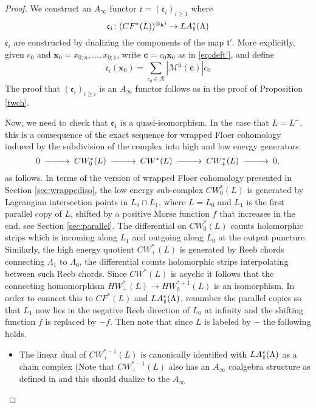 \documentclass{gtpart}
\renewcommand{\k}{\mathbf{k}}
\newcommand{\e}{\mathfrak{e}}
\renewcommand{\t}{\mathfrak{t}}
\newcommand{\fl}{\mathrm{fi}}
\renewcommand{\parallel}{{\mkern3mu\vphantom{\perp}\vrule depth 0pt\mkern2mu\vrule depth
0pt\mkern3mu}}
\begin{document}
\begin{proof} 
We construct an $A_\infty$ functor $\e = (\e_i)_{i \geq 1}$ where 
\[ 
\e_i \colon (CF^*(L))^{\otimes_{\k} i} \to LA_{\parallel}^*(\Lambda) 
\]
$\e_i$ are constructed by dualizing the components of the map $\t'$. More explicitly,
given $c_{0}$ and $\mathbf{x}_{0}=x_{0;n},\ldots, x_{0;1}$, write $\mathbf{c}=c_{0}\mathbf{x}_{0}$ as in \eqref{eq:deft'}, and define
\[ 
\e_i(\mathbf{x}_{0}) = 
\sum_{c_{0}\in\mathcal{R}} |\mathcal{M}^{\fl}(\mathbf{c})| c_{0} 
\]
The proof that $(\e_i)_{i \geq i}$ is an $A_\infty$ functor follows as in the proof of Proposition \ref{twch}. 

Now, we need to check that $\e_1$ is a quasi-isomorphism. In the case that $L=L^{-}$, this is a consequence of the exact sequence for wrapped Floer cohomology induced by the subdivision of the complex into high and low energy generators:
\[ 
\begin{CD}
0 @>>> CW^{\ast}_{0}(L) @>>> CW^{\ast}(L) @>>> CW^{\ast}_{+}(L) @>>> 0,
\end{CD}
\]
as follows. In terms of the version of wrapped Floer cohomology presented in Section
    \ref{sec:wrappediso}, the low energy sub-complex $CW^{\ast}_{0}(L)$ is generated by Lagrangian
    intersection points in $L_{0}\cap L_{1}$, where $L=L_{0}$ and $L_{1}$ is the first parallel copy
    of $L$, shifted by a positive Morse function $f$ that increases in the end, see Section
    \ref{sec:parallel}. The differential on $CW^{\ast}_{0}(L)$ counts holomorphic strips which is
    incoming along $L_{1}$ and outgoing along $L_{0}$ at the output puncture. Similarly, the high
    energy quotient $CW^{\ast}_{+}(L)$ is generated by Reeb chords connecting $\Lambda_{1}$ to
    $\Lambda_{0}$, the differential counts holomorphic strips interpolating between such Reeb
    chords.  Since $CW^{\ast}(L)$ is acyclic it follows that the connecting homomorphism $HW^{\ast}_{+}(L)\to HW^{\ast+1}_{0}(L)$   is an isomorphism. In order to connect this to $CF^{\ast}(L)$ and $LA_{\parallel}^{\ast}(\Lambda)$, renumber the parallel copies so that $L_{1}$ now lies in the negative Reeb direction of $L_{0}$ at infinity and the shifting function $f$ is replaced by $-f$. Then note that since $L$ is labeled by $-$ the following holds. 
\begin{itemize}
\item The linear dual of $CW^{\ast-1}_{+}(L)$ is canonically identified with
    $LA^{\ast}_{\parallel}(\Lambda)$ as a chain complex (Note that $CW^{\ast-1}_+(L)$ also has an
        $A_\infty$ coalgebra structure as defined in \cite{EO} and this should dualize to the $A_\infty$

\end{itemize}
\end{proof}
\end{document}
